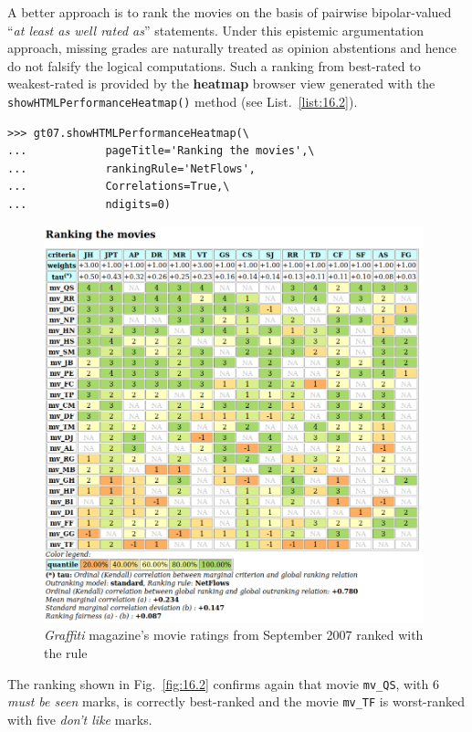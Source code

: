 A better approach is to rank the movies on the basis of pairwise bipolar-valued  ``\emph{at least as well rated as}'' statements. Under this epistemic argumentation approach, missing grades are naturally treated as opinion abstentions and hence do not falsify the logical computations. Such a \NetFlows ranking from best-rated to weakest-rated is provided by the \textbf{heatmap} browser view generated with the \texttt{showHTMLPerformanceHeatmap()} method (see List.~\vref{list:16.2}).
\begin{lstlisting}[caption={Showing the movie from best to worst rated in a heatmap view},label=list:16.2]
>>> gt07.showHTMLPerformanceHeatmap(\
...            pageTitle='Ranking the movies',\  
...            rankingRule='NetFlows',
...            Correlations=True,\
...            ndigits=0)
\end{lstlisting}
\begin{figure}[h]
\includegraphics[width=11cm]{Figures/16-2-graffiti07_2.png}
\caption{\emph{Graffiti} magazine's movie ratings from September 2007 ranked with the \NetFlows rule}
\label{fig:16.2}       %
\end{figure}

The \NetFlows ranking shown in Fig.~\vref{fig:16.2} confirms again that movie \texttt{mv\_QS}, with $6$ \emph{must be seen} marks, is correctly best-ranked and the movie \texttt{mv\_TF} is worst-ranked with five \emph{don't like} marks. 


